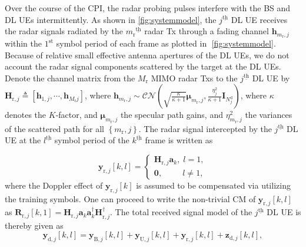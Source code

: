 \documentclass[9pt,journal]{IEEEtran}
\newcommand{\paren}[1]{\left({#1}\right)}
\newcommand{\bracket}[1]{{\left [{#1}\right ]}}
\newcommand{\braces}[1]{{\left\{ {#1}\right\}}}
\newcommand{\ith}[1]    {{#1}^{\underline{\text{th}}}}
\newcommand{\rr}{_\mathrm{r}}
\theoremstyle{definition}
\begin{document}
Over the course of the CPI, the radar probing pulses interfere with the BS and DL UEs intermittently. As shown in \figurename{\;\ref{fig:systemmodel}}, the $\ith{j}$ DL UE receives the radar signals radiated by the $\ith{m\rr}$ radar Tx through a fading channel $\mathbf{h}_{m\rr, j}$ within the $1^{\mathrm{st}}$ symbol period of each frame as plotted in \figurename{$\;$\ref{fig:systemmodel}}. Because of relative small effective antenna apertures of the DL UEs, we do not account the radar signal components scattered by the target at the DL UEs. Denote the channel matrix from the $\mathit{M}\rr$ MIMO radar Txs to the $\ith{j}$ DL UE by $\mathbf{H}_{\mathrm{r},j}\triangleq\bracket{\mathbf{h}_{\mathrm{1},j},\cdots,\mathbf{h}_{\mathit{M}\rr j}}$, where $\mathbf{h}_{m\rr, j}\sim\mathcal{CN}\paren{\sqrt{\frac{\kappa}{\kappa+1}}\boldsymbol{\mu}_{m\rr,j},\frac{\eta^2_j}{\kappa+1}\mathbf{I}_{\mathit{N}^{\textrm{d}}_j}}$, where $\kappa$ denotes the $K$-factor, and $\boldsymbol{\mu}_{m\rr,j}$ the specular path gains, and $\eta^2_{m\rr,j}$ the variances of the scattered path for all $\braces{m\rr,j}$. The radar signal intercepted by the $\ith{j}$ DL UE at the $\ith{l}$ symbol period of the $\ith{k}$ frame is written as \par\noindent\small
\begin{equation*}
    \mathbf{y}_{\mathrm{r},j}\bracket{k,l}=
    \begin{cases}
    \mathbf{H}_{\mathrm{r},j}\mathbf{a}_k, \;l=1,\\
    \mathbf{0}, \qquad~~ l\neq1,
    \end{cases}
\end{equation*}
\normalsize
where the Doppler effect of $\mathbf{y}_{\mathrm{r},j}\bracket{k}$ is assumed to be compensated via utilizing the training symbols\cite{MCMIMO_RadComm}. One can proceed to write the non-trivial CM of $\mathbf{y}_{\mathrm{r},j}\bracket{k,l}$ as $\mathbf{R}_{\mathrm{r},j}\bracket{k,1}=\mathbf{H}_{\mathrm{r},j}\mathbf{a}_k\mathbf{a}^\dagger_k\mathbf{H}^\dagger_{\mathrm{r},j}$. The total received signal model of the $\ith{j}$ DL UE is thereby given as 
\begin{equation}
\mathbf{y}_{\textrm{d},j}\bracket{k,l}=\mathbf{y}_{\textrm{B},j}\bracket{k,l}+\mathbf{y}_{\mathrm{U},j}\bracket{k,l}+\mathbf{y}_{\mathrm{r},j}\bracket{k,l}+\mathbf{z}_{\textrm{d},j}\bracket{k,l},
\end{equation}
\end{document}
